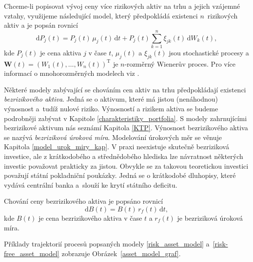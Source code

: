 \documentclass[a4paper,12pt]{report}
\theoremstyle{definition} \newtheorem{definice}[veta]{Definice}
\theoremstyle{remark}
\begin{document}
Chceme-li popisovat vývoj ceny více rizikových aktiv na trhu a jejich vzájemné vztahy, využijeme následující model, který předpokládá existenci $n$~rizikových aktiv a je popsán rovnicí
\begin{equation}\label{multi_risk_asset_model}
\mathrm{d}P_j(t)=P_j(t)\,\mu_j(t)\,\mathrm{d}t+P_j(t)\sum_{k=1}^{n}\xi_{jk}(t)\,\mathrm{d}W_k(t),
\end{equation}
kde $P_j(t)$ je cena aktiva $j$ v čase $t$, $\mu_j(t)$ a $\xi_{jk}(t)$ jsou stochastické procesy a $\boldsymbol{W}(t)=(W_1(t),\dots,W_n(t))^\mathrm{T}$ je $n$-rozměrný Wienerův proces. 
Pro více informací o mnohorozměrných modelech viz \cite{etheridge2002course}.

Některé modely zabývající se chováním cen aktiv na trhu předpokládají existenci \textit{bezrizikového aktiva}.
Jedná se o aktivum, které má jistou (nenáhodnou) výnosnost a~tudíž nulové riziko.
Výnosností a rizikem aktiva se budeme podrobněji zabývat v Kapitole \ref{charakteristiky_portfolia}. 
S modely zahrnujícími bezrizikové aktivum nás seznámí Kapitola \ref{KTP}.
Výnosnost bezrizikového aktiva se nazývá \textit{bezriziková úroková míra}.
Modelování úrokových měr se věnuje Kapitola \ref{model_urok_miry_kap}.
V praxi neexistuje skutečně bezriziková investice, ale z krátkodobého a střednědobého hlediska lze návratnost některých investic považovat prakticky za jistou.
Obvykle se za takovou teoretickou investici považují státní pokladniční poukázky.
Jedná se o krátkodobé dluhopisy, které vydává centrální banka a~slouží ke krytí státního deficitu.

Chování ceny bezrizikového aktiva je popsáno rovnicí
\begin{equation}\label{risk-free_asset_model}
\mathrm{d}B(t)=B(t)\,r_f(t)\,\mathrm{d}t,
\end{equation}
kde $B(t)$ je cena bezrizikového aktiva v čase $t$ a $r_f(t)$ je bezriziková úroková míra.

Příklady trajektorií procesů popsaných modely \eqref{risk_asset_model} a~\eqref{risk-free_asset_model} zobrazuje Obrázek~\ref{asset_model_graf}.
\end{document}

